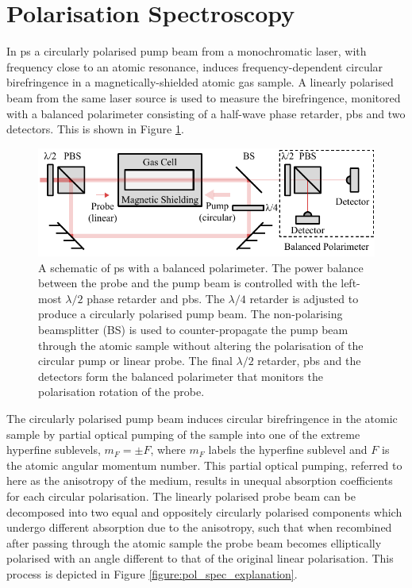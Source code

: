 \section{Polarisation Spectroscopy}%
\label{section:pol_spec_theory}

In \gls{ps} a circularly polarised pump beam from a monochromatic laser, with frequency close to an atomic resonance, induces frequency-dependent circular birefringence in a magnetically-shielded atomic gas sample.
A linearly polarised beam from the same laser source is used to measure the birefringence, monitored with a balanced polarimeter consisting of a half-wave phase retarder, \gls{pbs} and two detectors.
This is shown in Figure \ref{figure:pol_spec_schematic}.

\begin{figure}
\centering
\includegraphics[width=\linewidth]{part1/Figs/PolSpecSchematic.pdf}
\caption{A schematic of \gls{ps} with a balanced polarimeter.
The power balance between the probe and the pump beam is controlled with the left-most $\lambda/2$ phase retarder and \gls{pbs}.
The $\lambda/4$ retarder is adjusted to produce a circularly polarised pump beam.
The non-polarising beamsplitter (BS) is used to counter-propagate the pump beam through the atomic sample without altering the polarisation of the circular pump or linear probe.
The final $\lambda/2$ retarder, \gls{pbs} and the detectors form the balanced polarimeter that monitors the polarisation rotation of the probe.}
\label{figure:pol_spec_schematic}
\end{figure}

The circularly polarised pump beam induces circular birefringence in the atomic sample by partial optical pumping of the sample into one of the extreme hyperfine sublevels, $m_F=\pm F$, where $m_F$ labels the hyperfine sublevel and $F$ is the atomic angular momentum number.
This partial optical pumping, referred to here as the anisotropy of the medium, results in unequal absorption coefficients for each circular polarisation.
The linearly polarised probe beam can be decomposed into two equal and oppositely circularly polarised components which undergo different absorption due to the anisotropy, such that when recombined after passing through the atomic sample the probe beam becomes elliptically polarised with an angle different to that of the original linear polarisation.
This process is depicted in Figure \ref{figure:pol_spec_explanation}.

